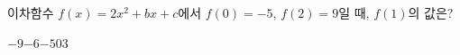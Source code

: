 이차함수 $f(x)=2x^2+bx+c$에서 $f(0)=-5$, $f(2)=9$일 때, $f(1)$의 값은?
\begin{choices32}{$-9$}{$-6$}{$-5$}{$0$}{$3$}\end{choices32}
